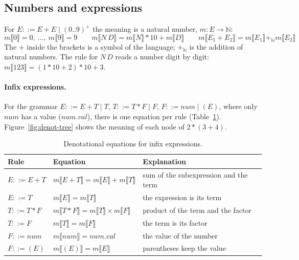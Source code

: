 \subsection{Numbers and expressions}

For $E ::= E + E \mid (0..9)^+$ the meaning is a natural number,
$m : E \to \mathbb{N}$:
\[
m\llbracket 0 \rrbracket = 0,\ \dots,\ m\llbracket 9 \rrbracket = 9 \qquad
m\llbracket N\, D \rrbracket = m\llbracket N \rrbracket * 10 + m\llbracket D \rrbracket \qquad
m\llbracket E_1 + E_2 \rrbracket = m\llbracket E_1 \rrbracket +_{\mathbb{N}} m\llbracket E_2 \rrbracket
\]
The $+$ inside the brackets is a symbol of the language; $+_{\mathbb{N}}$ is the
addition of natural numbers. The rule for $N\,D$ reads a number digit by
digit: $m\llbracket 123 \rrbracket = (1 * 10 + 2) * 10 + 3$.

\paragraph{Infix expressions.} For the grammar $E ::= E + T \mid T$,
$T ::= T * F \mid F$, $F ::= \mathit{num} \mid (E)$, where only $\mathit{num}$ has a value
($\mathit{num.val}$), there is one equation per rule (Table~\ref{tab:infix}).
Figure~\ref{fig:denot-tree} shows the meaning of each node of $2 * (3 + 4)$.

\begin{table}[h]
\centering
\small
\begin{tabular}{l l l}
  \toprule
  Rule & Equation & Explanation \\
  \midrule
  $E ::= E + T$ & $m\llbracket E + T \rrbracket = m\llbracket E \rrbracket + m\llbracket T \rrbracket$ & sum of the subexpression and the term \\
  $E ::= T$ & $m\llbracket E \rrbracket = m\llbracket T \rrbracket$ & the expression is its term \\
  $T ::= T * F$ & $m\llbracket T * F \rrbracket = m\llbracket T \rrbracket \times m\llbracket F \rrbracket$ & product of the term and the factor \\
  $T ::= F$ & $m\llbracket T \rrbracket = m\llbracket F \rrbracket$ & the term is its factor \\
  $F ::= \mathit{num}$ & $m\llbracket \mathit{num} \rrbracket = \mathit{num.val}$ & the value of the number \\
  $F ::= (E)$ & $m\llbracket (E) \rrbracket = m\llbracket E \rrbracket$ & parentheses keep the value \\
  \bottomrule
\end{tabular}
\caption{Denotational equations for infix expressions.}
\label{tab:infix}
\end{table}


